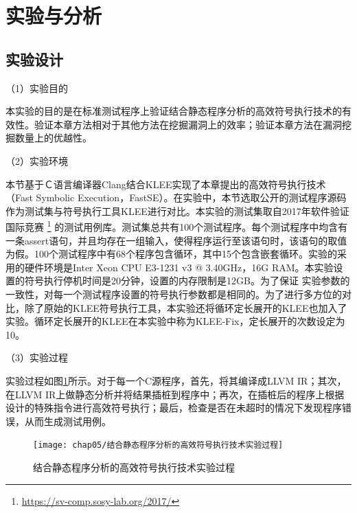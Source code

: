 %



\section{实验与分析}
\label{sec-experiment}

\subsection{实验设计}

（1）实验目的

本实验的目的是在标准测试程序上验证结合静态程序分析的高效符号执行技术的有效性。验证本章方法相对于其他方法在挖掘漏洞上的效率；验证本章方法在漏洞挖掘数量上的优越性。

（2）实验环境

本节基于Ｃ语言编译器Clang结合KLEE实现了本章提出的高效符号执行技术（Fast Symbolic Execution，FastSE）。在实验中，本节选取公开的测试程序源码作为测试集与符号执行工具KLEE进行对比。本实验的测试集取自2017年软件验证国际竞赛
\footnote{\url{https://sv-comp.sosy-lab.org/2017/}}
的测试用例库。测试集总共有100个测试程序。每个测试程序中均含有一条assert语句，并且均存在一组输入，使得程序运行至该语句时，该语句的取值为假。100个测试程序中有68个程序包含循环，其中15个包含嵌套循环。实验的采用的硬件环境是Inter Xeon CPU E3-1231 v3 @ 3.40GHz，16G RAM。本实验设置的符号执行停机时间是20分钟，设置的内存限制是12GB。为了保证
实验参数的一致性，对每一个测试程序设置的符号执行参数都是相同的。为了进行多方位的对比，除了原始的KLEE符号执行工具，本实验还将循环定长展开的KLEE也加入了实验。循环定长展开的KLEE在本实验中称为KLEE-Fix，定长展开的次数设定为10。

（3）实验过程

实验过程如图\ref{experiment_procedure}所示。对于每一个C源程序，首先，将其编译成LLVM IR；其次，在LLVM IR上做静态分析并将结果插桩到程序中；再次，在插桩后的程序上根据设计的特殊指令进行高效符号执行；最后，检查是否在未超时的情况下发现程序错误，从而生成测试用例。

\begin{figure}[h]
	\centering
	\texttt{[image: chap05/结合静态程序分析的高效符号执行技术实验过程]}
	\caption{结合静态程序分析的高效符号执行技术实验过程}
	\label{experiment_procedure}
\end{figure}

